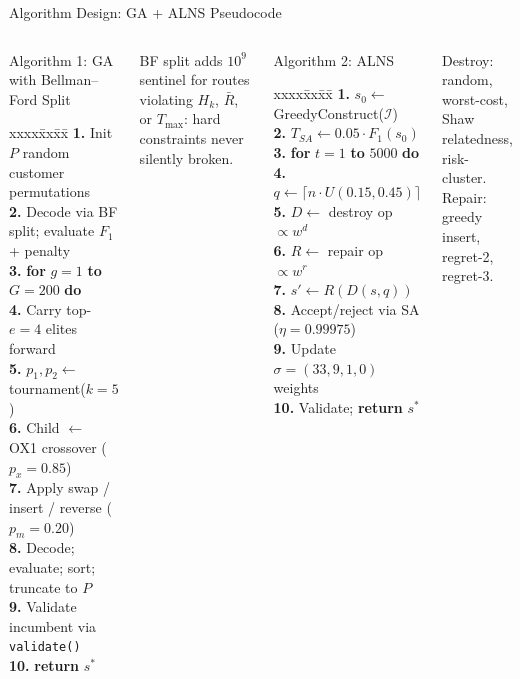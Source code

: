 \documentclass[aspectratio=169,t]{beamer}
\begin{document}
\begin{frame}{Algorithm Design: GA + ALNS Pseudocode}
\begin{columns}[T]
  \begin{block}{Algorithm 1: GA with Bellman--Ford Split}
  \footnotesize
  \begin{tabbing}
  xxxx\=xx\=xx\=\kill
  \textbf{1.}\>  Init $P$ random customer permutations\\
  \textbf{2.}\>  Decode via BF split; evaluate $F_1$ + penalty\\
  \textbf{3.}\>  \textbf{for} $g=1$ \textbf{to} $G=200$ \textbf{do}\\
  \textbf{4.}\>\> Carry top-$e=4$ elites forward\\
  \textbf{5.}\>\> $p_1,p_2 \leftarrow$ tournament($k=5$)\\
  \textbf{6.}\>\> Child $\leftarrow$ OX1 crossover ($p_x=0.85$)\\
  \textbf{7.}\>\> Apply swap / insert / reverse ($p_m=0.20$)\\
  \textbf{8.}\>\> Decode; evaluate; sort; truncate to $P$\\
  \textbf{9.}\>  Validate incumbent via \texttt{validate()}\\
  \textbf{10.}\> \textbf{return} $s^*$
  \end{tabbing}
  \end{block}
  \vspace{4pt}
  {\footnotesize BF split adds $10^9$ sentinel for routes violating $H_k$, $\bar{R}$, or $T_{\max}$: hard constraints never silently broken.}
  \begin{block}{Algorithm 2: ALNS}
  \footnotesize
  \begin{tabbing}
  xxxx\=xx\=xx\=\kill
  \textbf{1.}\>  $s_0 \leftarrow$ GreedyConstruct($\mathcal{I}$)\\
  \textbf{2.}\>  $T_{SA} \leftarrow 0.05\cdot F_1(s_0)$\\
  \textbf{3.}\>  \textbf{for} $t=1$ \textbf{to} $5000$ \textbf{do}\\
  \textbf{4.}\>\> $q \leftarrow \lceil n\cdot U(0.15,0.45)\rceil$\\
  \textbf{5.}\>\> $D \leftarrow$ destroy op $\propto w^d$\\
  \textbf{6.}\>\> $R \leftarrow$ repair op $\propto w^r$\\
  \textbf{7.}\>\> $s' \leftarrow R(D(s,q))$\\
  \textbf{8.}\>\> Accept/reject via SA ($\eta=0.99975$)\\
  \textbf{9.}\>\> Update $\sigma=(33,9,1,0)$ weights\\
  \textbf{10.}\> Validate; \textbf{return} $s^*$
  \end{tabbing}
  \end{block}
  \vspace{4pt}
  {\footnotesize Destroy: random, worst-cost, Shaw relatedness, risk-cluster.\\
  Repair: greedy insert, regret-2, regret-3.}
\end{columns}
\end{frame}
\end{document}
